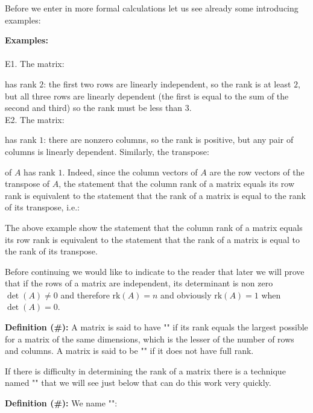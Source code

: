 	Before we enter in more formal calculations let us see already some introducing examples:
	\begin{tcolorbox}[colframe=black,colback=white,sharp corners]
	\textbf{{\Large {}}Examples:}\\\\
	E1. The matrix:
	
	has rank $2$: the first two rows are linearly independent, so the rank is at least $2$, but all three rows are linearly dependent (the first is equal to the sum of the second and third) so the rank must be less than $3$.\\
	
	E2. The matrix:
	
	has rank $1$: there are nonzero columns, so the rank is positive, but any pair of columns is linearly dependent. Similarly, the transpose:
	
	of $A$ has rank $1$. Indeed, since the column vectors of $A$ are the row vectors of the transpose of $A$, the statement that the column rank of a matrix equals its row rank is equivalent to the statement that the rank of a matrix is equal to the rank of its transpose, i.e.:
	
	\end{tcolorbox}
	The above example show the statement that the column rank of a matrix equals its row rank is equivalent to the statement that the rank of a matrix is equal to the rank of its transpose.
	
	Before continuing we would like to indicate to the reader that later we will prove that if the rows of a matrix are independent, its determinant is non zero $\det(A)\neq 0$ and therefore $\text{rk}(A)=n$ and obviously $\text{rk}(A)=1$ when $\det(A)=0$.
	
	\textbf{Definition (\#\mydef):} A matrix is said to have "" if its rank equals the largest possible for a matrix of the same dimensions, which is the lesser of the number of rows and columns. A matrix is said to be "" if it does not have full rank.
	
	\begin{tcolorbox}[title=Remark,colframe=black,arc=10pt]
	If there is difficulty in determining the rank of a matrix there is a technique named "" that we will see just below that can do this work very quickly.
	\end{tcolorbox}
	\textbf{Definition (\#\mydef):} We name "":
	
